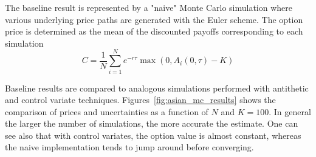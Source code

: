 The baseline result is represented by a "naive" Monte Carlo simulation where various underlying price paths are generated with the Euler scheme. The option price is determined as the mean of the discounted payoffs corresponding to each simulation
\begin{equation*}
C = \frac{1}{N}\sum_{i=1}^{N} e^{-r\tau}\max(0, A_i(0, \tau)-K)
\end{equation*}

Baseline results are compared to analogous simulations performed with antithetic and control variate techniques.
Figures~\ref{fig:asian_mc_results} shows the comparison of prices and uncertainties as a function of $N$ and $K=100$.
In general the larger the number of simulations, the more accurate the estimate.
One can see also that with control variates, the option value is almost constant, whereas the naive implementation tends to jump around before converging.

